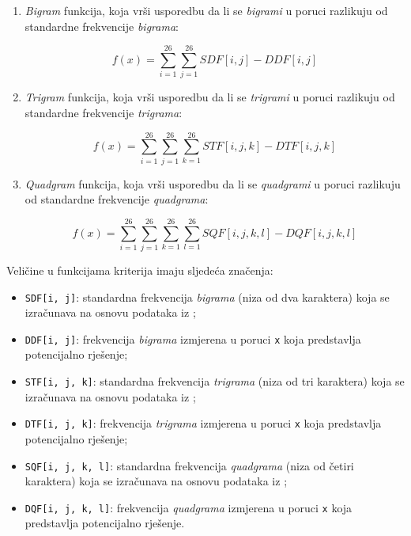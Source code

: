 \documentclass[12pt, a4paper]{article}
\begin{document}
\begin{enumerate}

\item \textit{Bigram} funkcija, koja vrši usporedbu da li se \textit{bigrami} u poruci razlikuju od standardne frekvencije \textit{bigrama}:

\begin{equation}
f(x) = \sum_{i = 1}^{26}{\sum_{j = 1}^{26}{SDF[i, j] - DDF[i, j]}}
\end{equation}

\item \textit{Trigram} funkcija, koja vrši usporedbu da li se \textit{trigrami} u poruci razlikuju od standardne frekvencije \textit{trigrama}:

\begin{equation}
f(x) = \sum_{i = 1}^{26}{\sum_{j = 1}^{26}{\sum_{k = 1}^{26}{STF[i, j, k] - DTF[i, j, k]}}}
\end{equation}

\item \textit{Quadgram} funkcija, koja vrši usporedbu da li se \textit{quadgrami} u poruci razlikuju od standardne frekvencije \textit{quadgrama}:

\begin{equation}
f(x) = \sum_{i = 1}^{26}{\sum_{j = 1}^{26}{\sum_{k = 1}^{26}{\sum_{l = 1}^{26}{SQF[i, j, k, l] - DQF[i, j, k, l]}}}}
\end{equation}

\end{enumerate}

Veličine u funkcijama kriterija imaju sljedeća značenja:

\begin{itemize}
\renewcommand\labelitemi{--}

\item \texttt{SDF[i, j]}: standardna frekvencija \textit{bigrama} (niza od dva karaktera) koja se izračunava na osnovu podataka iz \cite{letters};
\item \texttt{DDF[i, j]}: frekvencija \textit{bigrama} izmjerena u poruci \texttt{x} koja predstavlja potencijalno rješenje;
\item \texttt{STF[i, j, k]}: standardna frekvencija \textit{trigrama} (niza od tri karaktera) koja se izračunava na osnovu podataka iz \cite{letters};
\item \texttt{DTF[i, j, k]}: frekvencija \textit{trigrama} izmjerena u poruci \texttt{x} koja predstavlja potencijalno rješenje;
\item \texttt{SQF[i, j, k, l]}: standardna frekvencija \textit{quadgrama} (niza od četiri karaktera) koja se izračunava na osnovu podataka iz \cite{letters};
\item \texttt{DQF[i, j, k, l]}: frekvencija \textit{quadgrama} izmjerena u poruci \texttt{x} koja predstavlja potencijalno rješenje.

\end{itemize}
\end{document}
